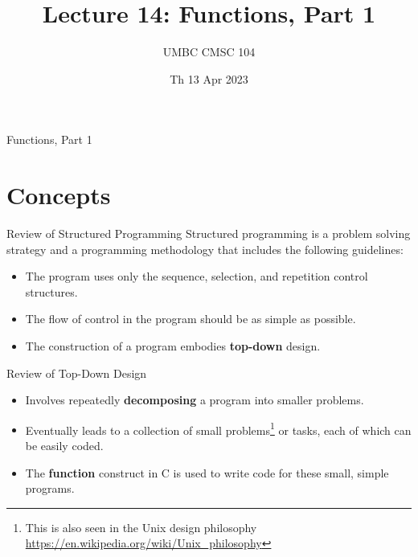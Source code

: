 \documentclass[graphics]{beamer}
\title{Lecture 14: Functions, Part 1}
\author{UMBC CMSC 104}
\date{Th 13 Apr 2023}
\begin{document}
\begin{frame}{}
\centering
    Functions, Part 1
\end{frame}

\frame{\tableofcontents}

\section{Concepts}
\begin{frame}{Review of Structured Programming}
    Structured programming is a problem solving strategy and a programming methodology that includes the following guidelines:
    \begin{itemize}
        \item The program uses only the sequence, selection, and repetition control structures.
        \item The flow of control in the program should be as simple as possible.
        \item The construction of a program embodies \textbf{top-down} design.
    \end{itemize}
\end{frame}

\begin{frame}{Review of Top-Down Design}
    \begin{itemize}
        \item Involves repeatedly \textbf{decomposing} a program into smaller problems.
        \item Eventually leads to a collection of small problems\footnote{This is also seen in the Unix design philosophy \url{https://en.wikipedia.org/wiki/Unix_philosophy}} or tasks, each of which can be easily coded.
        \item The \textbf{function} construct in C is used to write code for these small, simple programs.
    \end{itemize}
\end{frame}
\end{document}
